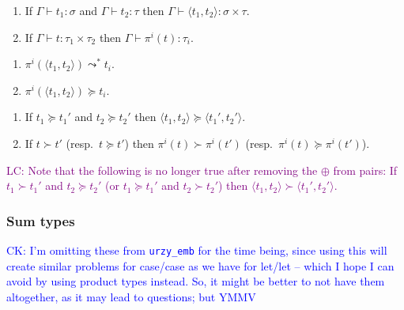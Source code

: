 \documentclass[runningheads,a4paper]{llncs}
\newcommand{\pair}[2]{\langle #1,#2 \rangle}
\newcommand{\flatten}{\mathtt{flatten}}
\newcommand{\lift}{\mathtt{lift}}
\newcommand{\proves}{\vdash}
\newcommand{\CK}[1]{\textcolor{blue}{CK: #1}}
\newcommand{\LC}[1]{\textcolor{purple}{LC: #1}}
\begin{document}
\begin{lemma}
  \begin{enumerate}
  \item If $\Gamma \proves t_1 : \sigma$ and $\Gamma \proves t_2 :
    \tau$ then $\Gamma \proves \pair{t_1}{t_2} : \sigma \times \tau$.
  \item If $\Gamma \proves t : \tau_1 \times \tau_2$ then $\Gamma
    \proves \pi^i(t) : \tau_i$.
  \end{enumerate}
\end{lemma}

\begin{lemma}
  \begin{enumerate}
  \item $\pi^i(\pair{t_1}{t_2}) \leadsto^* t_i %
    $.
  \item $\pi^i(\pair{t_1}{t_2}) \succeq t_i$.
  \end{enumerate}
\end{lemma}

\begin{lemma}
  \begin{enumerate}
  \item If $t_1 \succeq t_1'$ and $t_2 \succeq t_2'$ then
    $\pair{t_1}{t_2} \succeq \pair{t_1'}{t_2'}$.
  \item If $t \succ t'$ (resp.~$t \succeq t'$) then $\pi^i(t) \succ
    \pi^i(t')$ (resp.~$\pi^i(t)\succeq \pi^i(t')$).
  \end{enumerate}
\end{lemma}

\LC{Note that the following is no longer true after removing the
  $\oplus$ from pairs: If $t_1 \succ t_1'$ and $t_2 \succeq t_2'$ (or
  $t_1 \succeq t_1'$ and $t_2 \succ t_2'$) then $\pair{t_1}{t_2} \succ
  \pair{t_1'}{t_2'}$.}

\subsubsection{Sum types}
\CK{I'm omitting these from \texttt{urzy\_emb} for the time being,
since using this will create similar problems for case/case as we have
for let/let -- which I hope I can avoid by using product types instead.
So, it might be better to not have them altogether, as it may lead to
questions; but YMMV}
\end{document}
